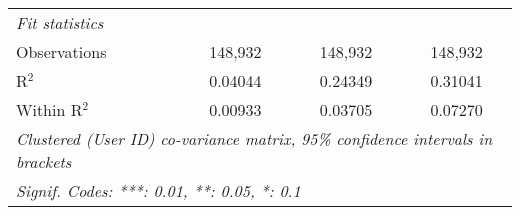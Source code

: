 \begin{table}[htbp]
\begin{threeparttable}[b]
\begin{tabular}{lccc}
         \emph{Fit statistics}\\
         Observations                    & 148,932           & 148,932          & 148,932\\  
         R$^2$                           & 0.04044           & 0.24349          & 0.31041\\  
         Within R$^2$                    & 0.00933           & 0.03705          & 0.07270\\  
         \midrule \midrule
         \multicolumn{4}{l}{\emph{Clustered (User ID) co-variance matrix, 95\% confidence intervals in brackets}}\\
         \multicolumn{4}{l}{\emph{Signif. Codes: ***: 0.01, **: 0.05, *: 0.1}}\\
      \end{tabular}
   \end{threeparttable}
\end{table}


